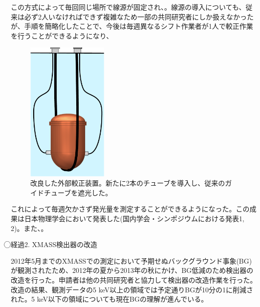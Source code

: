 \documentclass[10pt,a4paper,twoside]{jarticle}
\newcommand{\研究課題名}{XMASS検出器を用いた季節変動による暗黒物質の直接探索}
\newcommand{\研究機関名}{神戸大学}
\newcommand{\申請者氏名}{岡直哉}
\newcommand{\研究代表者氏名}{\申請者氏名}
\newcommand{\研究期間の最終元号年度}{29}	%
\begin{document}
{この方式によって毎回同じ場所で線源が固定され、{\bf \textcolor{red}{}}。線源の導入についても、従来は必ず2人いなければできず複雑なため一部の共同研究者にしか扱えなかったが、手順を簡略化したことで、今後は毎週異なるシフト作業者が1人で較正作業を行うことができるようになり、
\begin{figure}
         		\begin{center}
		         \includegraphics[width=4cm]{okahose.pdf}
		         \caption{改良した外部較正装置。新たに2本のチューブを導入し、従来のガイドチューブを遮光した。}
		         \label{fig:okahose}
	         \end{center}
         \end{figure}
これによって毎週欠かさず発光量を測定することができるようになった。この成果は日本物理学会において発表した(国内学会・シンポジウムにおける発表1, 2)。また、{\bf {}}。\par
\textcircled{}経過2. XMASS検出器の改造\par
2012年5月までのXMASSでの測定において予期せぬバックグラウンド事象(BG)が観測されたため、2012年の夏から2013年の秋にかけ、BG低減のため検出器の改造を行った。申請者は他の共同研究者と協力して検出器の改造作業を行った。改造の結果、観測データの5 keV以上の領域では予定通りBGが10分の1に削減された。5 keV以下の領域についても現在BGの理解が進んでいる。\par

}
\end{document}
